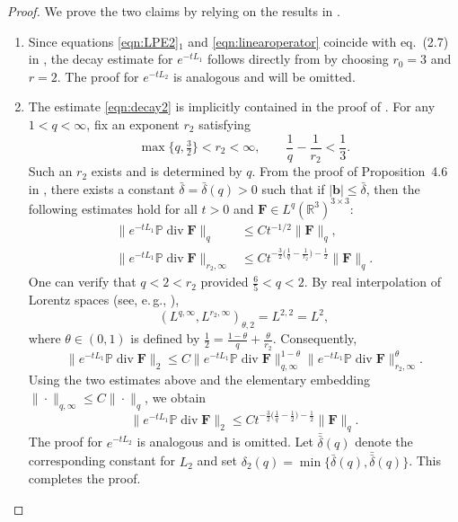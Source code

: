 \documentclass[10pt]{amsart}
\theoremstyle{plain}
\theoremstyle{definition}
\theoremstyle{remark}
\numberwithin{equation}{section}
\newcommand{\bb}{{\boldsymbol{b}}}
\newcommand{\BF}{{\boldsymbol{F}}}
\begin{document}
\begin{proof} We prove the two claims by relying on the results in \cite{HishidaSchonbek16}. 
\begin{enumerate}[label={(\roman*)}]
    \item Since equations \eqref{eqn:LPE2}$_1$ and \eqref{eqn:linearoperator} coincide with eq.~(2.7) in \cite{HishidaSchonbek16}, the decay estimate for $e^{-tL_1}$ follows directly from \cite[Theorem 2.2]{HishidaSchonbek16} by choosing $r_0 = 3$ and $r = 2$. The proof for $e^{-tL_2}$ is analogous and will be omitted.
\item The estimate \cref{eqn:decay2} is implicitly contained in the proof of  \cite[Proposition~4.6]{HishidaSchonbek16}.
For any $1<q<\infty$, fix an exponent $r_2$ satisfying  
\[
\max\{q,\tfrac32\}<r_2<\infty,\qquad \frac1q-\frac1{r_2}<\frac13.
\] 
Such an $r_2$ exists and is determined by $q$. From the proof of Proposition~4.6 in \cite{HishidaSchonbek16}, there exists a constant $\bar \delta=\bar \delta(q)>0$ such that if $|\bb|\le \bar\delta$, then the following estimates hold for all $t>0$ and $\BF\in L^q(\mathbb R^3)^{3\times3}$:
\begin{align*}
\|e^{-tL_1}\mathbb P\operatorname{div}\BF\|_q &\le C t^{-1/2}\|\BF\|_q,\\
\|e^{-tL_1}\mathbb P\operatorname{div}\BF\|_{r_2,\infty} &\le C t^{-\frac32\bigl(\frac1q-\frac1{r_2}\bigr)-\frac12}\|\BF\|_q.
\end{align*}
One can verify that $q<2<r_2$ provided $\frac65<q<2$.
By real interpolation of Lorentz spaces (see, e.\,g., \cite[Theorem 5.3.1]{BerghLofstrom76}),
\[
(L^{q,\infty}, L^{r_2,\infty})_{\theta,2}=L^{2,2}=L^2,
\]
where $\theta\in(0,1)$ is defined by $\frac12 = \frac{1-\theta}{q} + \frac{\theta}{r_2}$.
Consequently,
\[
\|e^{-tL_1}\mathbb P\operatorname{div}\BF\|_2 \le C \|e^{-tL_1}\mathbb P\operatorname{div}\BF\|_{q,\infty}^{1-\theta}
\|e^{-tL_1}\mathbb P\operatorname{div}\BF\|_{r_2,\infty}^{\theta}.
\]
Using the two estimates above and the elementary embedding $\|\cdot\|_{q,\infty}\le C\|\cdot\|_q$, we obtain
\[
\|e^{-tL_1}\mathbb P\operatorname{div}\BF\|_2 
\le  C t^{-\frac32\bigl(\frac1q-\frac12\bigr)-\frac12}\|\BF\|_q.
\]
The proof for $e^{-tL_2}$ is analogous and is omitted. 
Let $\bar{\bar\delta}(q)$ denote the corresponding constant for $L_2$ and set 
$\delta_2(q)=\min\{\bar\delta(q),\bar{\bar\delta}(q)\}$. 
This completes the proof.
\end{enumerate}
\end{proof}
\end{document}
